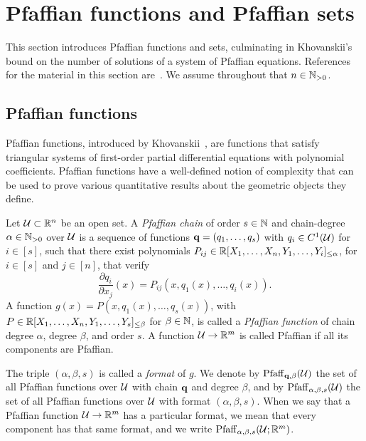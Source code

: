 \section{Pfaffian functions and Pfaffian sets}\label{sec:pfaffian}
This section introduces Pfaffian functions and sets, culminating in Khovanskii's bound on the number of solutions of a system of Pfaffian equations. References for the material in this section are~\cite{khovanskiui1991fewnomials, zell2003quantitative, gabrielov2004complexity}. We assume throughout that $n\in \mathbb{N}_{>0}$.

\subsection{Pfaffian functions}
Pfaffian functions, introduced by Khovanskii~\cite{khovanskiui1991fewnomials}, are functions that satisfy triangular systems of first-order partial differential equations with polynomial coefficients. Pfaffian functions have a well-defined notion of complexity that can be used to prove various quantitative results about the geometric objects they define.

\begin{definition}
Let $\mathcal{U} \subset \mathbb{R}^n$ be an open set. A \emph{Pfaffian chain} of order $s \in \mathbb{N}$ and chain-degree $\alpha \in \mathbb{N}_{>0}$ over $\mathcal{U}$ is a sequence of functions $\mathbf{q}= (q_1, \dotsc, q_s)$ with $q_i\in C^1(\mathcal{U})$ for $i\in [s]$, such that there exist polynomials $P_{ij}\in \mathbb{R}[X_1,\dots,X_n,Y_1,\dots,Y_i]_{\leq \alpha}$, for $i\in [s]$ and $j\in [n]$, that verify
\begin{equation}\label{eq:pfaffchain}
\frac{\partial q_i}{\partial x_j}(x) = P_{ij}(x, q_1(x), \dotsc, q_i(x)).
\end{equation}
A function $g(x)=P(x,q_1(x),\dots,q_s(x))$, with $P\in \mathbb{R}[X_1,\dots,X_n,Y_1,\dots,Y_s]_{\leq \beta}$ for $\beta\in \mathbb{N}$, is called a \emph{Pfaffian function} of chain degree $\alpha$, degree $\beta$, and order $s$.  A function $\mathcal{U}\to \mathbb{R}^m$ is called Pfaffian if all its components are Pfaffian. 
\end{definition}

The triple $(\alpha, \beta, s)$ is called a \emph{format} of $g$. We denote by $\mathrm{Pfaff}_{\mathbf{q},\beta}(\mathcal{U})$ the set of all Pfaffian functions over $\mathcal{U}$ with chain $\mathbf{q}$ and degree $\beta$, and by $\mathrm{Pfaff}_{\alpha,\beta,s}(\mathcal{U})$ the set of all Pfaffian functions over $\mathcal{U}$ with format $(\alpha,\beta,s)$.  When we say that a Pfaffian function $\mathcal{U}\to \mathbb{R}^m$ has a particular format, we mean that every component has that same format, and we write $\mathrm{Pfaff}_{\alpha,\beta,s}(\mathcal{U}; \mathbb{R}^m)$.

